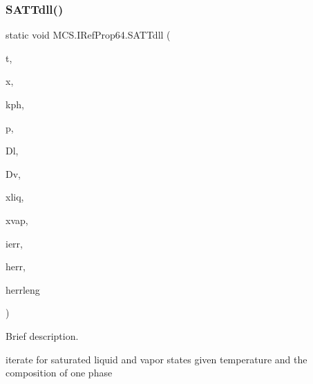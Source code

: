\hypertarget{class_m_c_s_1_1_i_ref_prop64_ab4f37c2f5e1b185a0e7b43ada9506c3f}{}\label{class_m_c_s_1_1_i_ref_prop64_ab4f37c2f5e1b185a0e7b43ada9506c3f} 
\subsubsection{\texorpdfstring{S\+A\+T\+Tdll()}{SATTdll()}}
{\footnotesize\ttfamily static void M\+C\+S.\+I\+Ref\+Prop64.\+S\+A\+T\+Tdll (\begin{DoxyParamCaption}\item[{ref double}]{t,  }\item[{\mbox{[}\+Marshal\+As(\+Unmanaged\+Type.\+L\+P\+Array, Size\+Param\+Index=0)\mbox{]} double \mbox{[}$\,$\mbox{]}}]{x,  }\item[{ref long}]{kph,  }\item[{ref double}]{p,  }\item[{ref double}]{Dl,  }\item[{ref double}]{Dv,  }\item[{\mbox{[}\+Marshal\+As(\+Unmanaged\+Type.\+L\+P\+Array, Size\+Param\+Index=0)\mbox{]} double \mbox{[}$\,$\mbox{]}}]{xliq,  }\item[{\mbox{[}\+Marshal\+As(\+Unmanaged\+Type.\+L\+P\+Array, Size\+Param\+Index=0)\mbox{]} double \mbox{[}$\,$\mbox{]}}]{xvap,  }\item[{ref long}]{ierr,  }\item[{\mbox{[}\+Marshal\+As(\+Unmanaged\+Type.\+V\+B\+By\+Ref\+Str)\mbox{]} ref string}]{herr,  }\item[{ref long}]{herrleng }\end{DoxyParamCaption})}



Brief description. 

iterate for saturated liquid and vapor states given temperature and the composition of one phase

